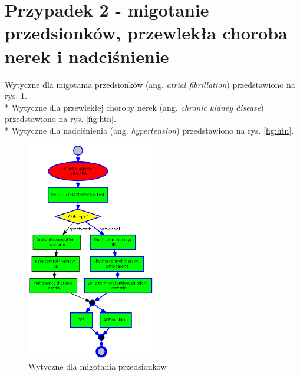 \section{Przypadek 2 - migotanie przedsionków, przewlekła choroba nerek i nadciśnienie}
Wytyczne dla migotania przedsionków (ang. \textit{atrial fibrillation}) przedstawiono na rys. \ref{fig:afib}.\\*
Wytyczne dla przewlekłej choroby nerek (ang. \textit{chronic kidney disease}) przedstawiono na rys. \ref{fig:htn}.\\*
Wytyczne dla nadciśnienia (ang. \textit{hypertension}) przedstawiono na rys. \ref{fig:htn}.
\begin{figure}[H]
\centering
\includegraphics[width=0.5\textwidth]{img/afib-ver-4.png}
\caption{Wytyczne dla migotania przedsionków}
\label{fig:afib}
\end{figure}
\newpage
